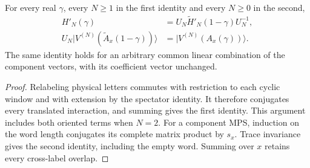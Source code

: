 \begin{lemma}
    \label{thm:mpo_joint_endpoint_swap_periodic}
    \leanok
    For every real $\gamma$, every $N\ge1$ in the first identity and
    every $N\ge0$ in the second,
    \begin{align}
        H'_N(\gamma) & =U_N\widetilde H'_N(1-\gamma)U_N^{-1}, \\
        U_N\lvert V^{(N)}(\widetilde A_x(1-\gamma))\rangle
                     & =\lvert V^{(N)}(A_x(\gamma))\rangle.
        \label{eq:mpo_joint_endpoint_swap_periodic}
    \end{align}
    The same identity holds for an arbitrary common linear combination
    of the component vectors, with its coefficient vector unchanged.
\end{lemma}
\begin{proof}
    \leanok
    Relabeling physical letters commutes with restriction to each cyclic
    window and with extension by the spectator identity. It therefore
    conjugates every translated interaction, and summing gives the first
    identity. This argument includes both oriented terms when $N=2$.
    For a component MPS, induction on the word length conjugates its
    complete matrix product by $s_x$. Trace invariance gives the second
    identity, including the empty word. Summing over $x$ retains every
    cross-label overlap.
\end{proof}

